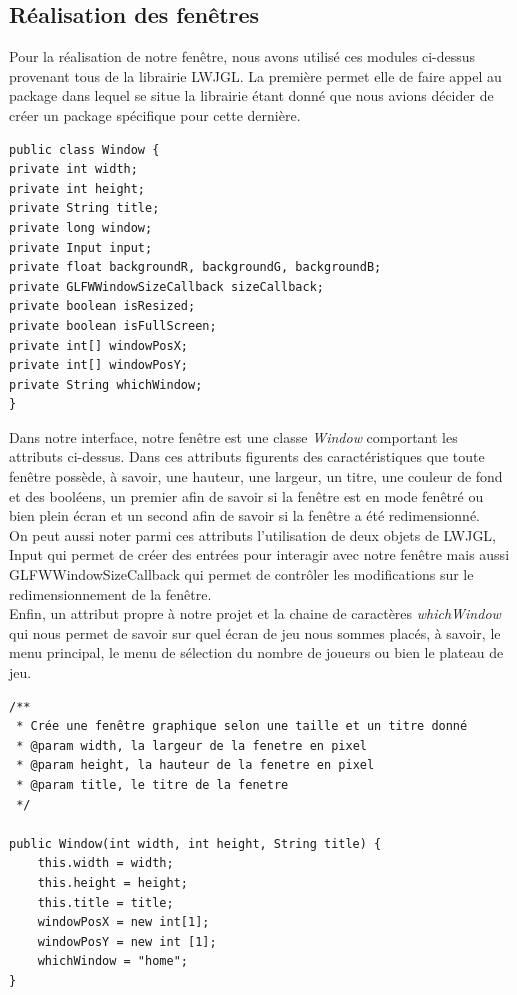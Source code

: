 \documentclass{article}
\begin{document}
	\subsection{Réalisation des fenêtres}
\indent Pour la réalisation de notre fenêtre, nous avons utilisé ces modules ci-dessus provenant tous de la librairie LWJGL. La première permet elle de faire appel au package dans lequel se situe la librairie étant donné que nous avions décider de créer un package spécifique pour cette dernière.
\medbreak
	\begin{lstlisting}
public class Window {
private int width;
private int height;
private String title;
private long window;
private Input input;
private float backgroundR, backgroundG, backgroundB;
private GLFWWindowSizeCallback sizeCallback;
private boolean isResized;
private boolean isFullScreen;
private int[] windowPosX;
private int[] windowPosY;
private String whichWindow; 
}
	\end{lstlisting}
\medbreak
\indent Dans notre interface, notre fenêtre est une classe \textit{Window} comportant les attributs ci-dessus. Dans ces attributs figurents des caractéristiques que toute fenêtre possède, à savoir, une hauteur, une largeur, un titre, une couleur de fond et des booléens, un premier afin de savoir si la fenêtre est en mode fenêtré ou bien plein écran et un second afin de savoir si la fenêtre a été redimensionné. \\ 

On peut aussi noter parmi ces attributs l'utilisation de deux objets de LWJGL, Input qui permet de créer des entrées pour interagir avec notre fenêtre mais aussi GLFWWindowSizeCallback qui permet de contrôler les modifications sur le redimensionnement de la fenêtre. \\ 

Enfin, un attribut propre à notre projet et la chaine de caractères \textit{whichWindow} qui nous permet de savoir sur quel écran de jeu nous sommes placés, à savoir, le menu principal, le menu de sélection du nombre de joueurs ou bien le plateau de jeu.
	\begin{lstlisting}
/**
 * Crée une fenêtre graphique selon une taille et un titre donné
 * @param width, la largeur de la fenetre en pixel
 * @param height, la hauteur de la fenetre en pixel
 * @param title, le titre de la fenetre
 */

public Window(int width, int height, String title) {
	this.width = width;
	this.height = height;
	this.title = title;
	windowPosX = new int[1];
	windowPosY = new int [1];
	whichWindow = "home";
}
	\end{lstlisting}
	
\end{document}
